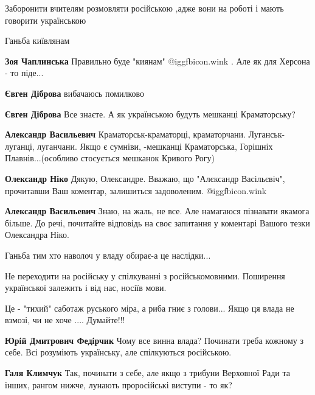 \begin{itemize}
\begin{itemize}
\end{itemize} %

Заборонити вчителям розмовляти російською ,адже вони на роботі і мають говорити українською

Ганьба київлянам

\begin{itemize} %
\textbf{Зоя Чаплинська} Правильно буде "киянам" @igg{fbicon.wink} . Але як для Херсона - то піде...

\begin{itemize} %
\textbf{Євген Діброва} вибачаюсь помилково

\textbf{Євген Діброва} Все знаєте. А як українською будуть мешканці Краматорську?

\textbf{Александр Васильевич} Краматорськ-краматорці, краматорчани. Луганськ-луганці, луганчани. Якщо є сумніви, -мешканці Краматорська, Горішніх Плавнів...(особливо стосується мешканок Кривого Рогу)

\textbf{Олександр Ніко} Дякую, Олександре. Вважаю, що "Алєксандр Васільєвіч", прочитавши Ваш коментар, залишиться задоволеним. @igg{fbicon.wink} 

\textbf{Александр Васильевич} Знаю, на жаль, не все. Але намагаюся пізнавати якамога більше. До речі, почитайте відповідь на своє запитання у коментарі Вашого тезки Олександра Ніко.
\end{itemize} %

Ганьба тим хто наволоч у владу обирає-а це наслідки...

\end{itemize} %

Не переходити на російську у спілкуванні з російськомовними. Поширення
української залежить і від нас, носіїв мови.



Це - "тихий" саботаж руського міра, а риба гниє з голови... Якщо ця влада не
взмозі, чи не хоче ....  Думайте!!!

\begin{itemize} %
\textbf{Юрій Дмитрович Федірчик} Чому все винна влада? Починати треба кожному з себе. Всі розуміють українську, але спілкуються російською.

\begin{itemize} %
\textbf{Галя Климчук} Так, починати з себе, але якщо з трибуни Верховної Ради та інших, рангом нижче, лунають проросійські виступи - то як?


\end{itemize}
\end{itemize}
\end{itemize}
